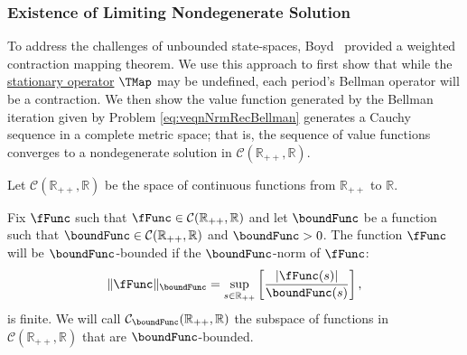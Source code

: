 \documentclass[BufferStockTheory]{subfiles}
\begin{document}
\begin{comment}
Next, define the `Value of Autarky Factor:'\hypertarget{VAFacDefn}{} 

$DiscFac \PermGroFac^{1-\CRRA}\mathbb{E}(\permShk^{1-\CRRA})$
\end{align}

\end{comment}

\begin{comment}
alternative: In the absence of the precautionary motive, the {\RIC} a consumer from being so pathologically patient so as to demand a growth factor of consumption that can imply an arbitrarily small share of current consumption to market resources.

alternative: remove any qualifier, \RIC and patience actually apply to all consumers. 
\end{comment}

\hypertarget{Conditions-Under-Which-the-Problem-Defines-a-Contraction-Mapping}{}
\subsubsection{Existence of Limiting Nondegenerate Solution}\label{subsubsec:eventuallyCauchy}

To address the challenges of unbounded state-spaces, Boyd~\citeyearpar{jboydWeighted} provided a weighted contraction mapping theorem. We use this approach to first show that while the \hyperlink{Stationary-Bellman-Operator}{stationary operator} $\TMap$ may be undefined, each period's Bellman operator will be a contraction. We then show the value function generated by the Bellman iteration  given by Problem \eqref{eq:veqnNrmRecBellman} generates a Cauchy sequence in a complete metric space; that is, the sequence of value functions converges to a nondegenerate solution in $\mathcal{C}(\mathbb{R}_{++},\mathbb{R})$.

Let $\mathcal{C}(\mathbb{R}_{++},\mathbb{R})$ be the space of continuous functions from $\mathbb{R}_{++}$ to $\mathbb{R}$.

\begin{comment}
check range $Y$ compatibility with space in Boyd. 
check use of term null vector
\end{comment}

\begin{definition}
  Fix $\fFunc$ such that $\fFunc \in \mathcal{C}(\mathbb{R}_{++},\mathbb{R})$ and let $\boundFunc$ be a function such that $\boundFunc\in \mathcal{C}(\mathbb{R}_{++},\mathbb{R})$ and $\boundFunc >0$. The function $\fFunc$ will be $\boundFunc$-bounded if the $\boundFunc$-norm of $\fFunc$:
  \begin{equation}
    \Vert \fFunc\Vert _{\boundFunc }=\sup_{s\in \mathbb{R}_{++}}\left[ \frac{|\fFunc(s)|}{\boundFunc (s)}\right],
    \label{eq:phinorm}
  \end{equation}%
  is finite. We will call $\mathcal{C}_{\boundFunc}(\mathbb{R}_{++},\mathbb{R})$ the subspace of functions in $\mathcal{C}(\mathbb{R}_{++},\mathbb{R})$ that are $\boundFunc$-bounded.
\end{definition}
\end{document}

